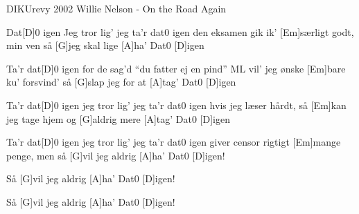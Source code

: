 {DIKUrevy 2002}
{Willie Nelson - On the Road Again}
{
Dat[D]0 igen
Jeg tror lig' jeg ta'r dat0 igen
den eksamen gik ik' [Em]særligt godt, min ven
så [G]jeg skal lige [A]ha' Dat0 [D]igen  

Ta'r dat[D]0 igen
for de sag'd ``du fatter ej en pind''
ML vil' jeg ønske [Em]bare ku' forsvind'
så [G]slap jeg for at [A]tag' Dat0 [D]igen


  
Ta'r dat[D]0 igen
jeg tror lig' jeg ta'r dat0 igen
hvis jeg læser hårdt, så [Em]kan jeg tage hjem
og [G]aldrig mere [A]tag' Dat0 [D]igen



Ta'r dat[D]0 igen
jeg tror lig' jeg ta'r dat0 igen
giver censor rigtigt [Em]mange penge, men
så [G]vil jeg aldrig [A]ha' Dat0 [D]igen!

Så [G]vil jeg aldrig [A]ha' Dat0 [D]igen!


Så [G]vil jeg aldrig [A]ha' Dat0 [D]igen!
}